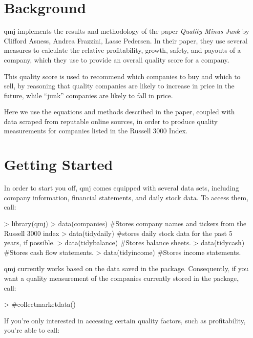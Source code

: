 \documentclass[12pt]{article}
\begin{document}

\section*{Background}
qmj implements the results and methodology of the paper \emph{Quality Minus Junk} by Clifford Asness, Andrea Frazzini, Lasse Pedersen. In their paper, they use several measures to calculate the relative profitability, growth, safety, and payouts of a company, which they use to provide an overall quality score for a company.

This quality score is used to recommend which companies to buy and which to sell, by reasoning that quality companies are likely to increase in price in the future, while ``junk'' companies are likely to fall in price.

Here we use the equations and methods described in the paper, coupled with data scraped from reputable online sources, in order to produce quality measurements for companies listed in the Russell 3000 Index.

\section*{Getting Started}
In order to start you off, qmj comes equipped with several data sets, including company information, financial statements, and daily stock data. To access them, call:

\begin{Schunk}
\begin{Sinput}
> library(qmj)
> data(companies) #Stores company names and tickers from the Russell 3000 index
> data(tidydaily)  #stores daily stock data for the past 5 years, if possible.
> data(tidybalance) #Stores balance sheets.
> data(tidycash) #Stores cash flow statements.
> data(tidyincome) #Stores income statements.
\end{Sinput}
\end{Schunk}

qmj currently works based on the data saved in the package. Consequently, if you want a quality measurement of the companies currently stored in the package, call:

\begin{Schunk}
\begin{Sinput}
> #collectmarketdata()
\end{Sinput}
\end{Schunk}

If you're only interested in accessing certain quality factors, such as profitability, you're able to call:
\end{document}
